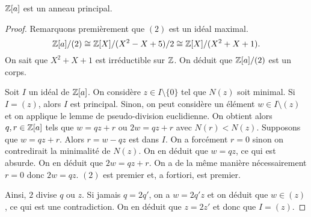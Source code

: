 \documentclass[../main.tex]{subfiles}
\begin{document}
\begin{proposition}
    \(\mathbb{Z}[a]\) est un anneau principal.
\end{proposition}
\begin{proof} Remarquons premièrement que \((2)\) est un idéal maximal.
    \begin{equation}
        \mathbb{Z}[a]/(2) \cong \mathbb{Z}[X]/(X^2 - X+5)/2 \cong \mathbb{Z}[X]/(X^2 + X + 1).
    \end{equation}
    On sait que \(X^2 + X + 1\) est irréductible sur \(\mathbb{Z}\). On déduit que \(\mathbb{Z}[a]/(2)\) est un corps.

    Soit \(I\) un idéal de \(\mathbb{Z}[a]\). On considère \(z\in I\setminus \{0\}\) tel que \(N(z)\) soit minimal.
    Si \(I = (z)\), alors \(I\) est principal. Sinon, on peut considère un élément \(w\in I\setminus(z)\) et on applique le lemme de pseudo-division euclidienne.
    On obtient alors \(q,r\in\mathbb{Z}[a]\) tels que \(w = qz + r\) ou \(2w = qz + r\) avec \(N(r) < N(z)\). Supposons que \(w = qz +r\).
    Alors \(r = w - qz\) est dans \(I\). On a forcément \(r = 0\) sinon on contredirait la minimalité de \(N(z)\). On en déduit que \(w = qz\), ce qui est absurde.
    On en déduit que \(2w = qz + r\). On a de la même manière nécessairement \(r = 0\) donc \(2w = qz\). \((2)\) est premier et, a fortiori, est premier.

    Ainsi, \(2\) divise \(q\) ou \(z\). Si jamais \(q = 2q'\), on a \(w = 2q'z\) et on déduit que \(w\in (z)\), ce qui est une contradiction. On en déduit que \(z = 2z'\)
    et donc que \(I = (z)\).
\end{proof}
\end{document}
